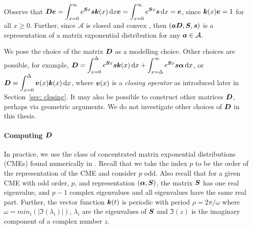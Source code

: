 Observe that \(\boldsymbol D\boldsymbol e = \displaystyle \int_{x=0}^\infty e^{\boldsymbol S x }\boldsymbol s \boldsymbol k(x)\, \mathrm{d} x\boldsymbol e =\displaystyle \int_{x=0}^\infty e^{\boldsymbol S x }\boldsymbol s \, \mathrm{d} x=\boldsymbol e\), since \(\boldsymbol k(x)\boldsymbol e = 1\) for all \(x\geq 0\). Further, since \(\mathcal A\) is closed and convex \citep{MEinAP}, then \((\boldsymbol a \boldsymbol D,\boldsymbol S,\boldsymbol s)\) is a representation of a matrix exponential distribution for any \(\boldsymbol a\in\mathcal A\). 

We pose the choice of the matrix \(\boldsymbol D\) as a modelling choice. Other choices are possible, for example, \(\displaystyle \boldsymbol D = \int_{x=0}^{\Delta}e^{\boldsymbol S x }\boldsymbol s \boldsymbol k(x)\, \mathrm{d} x + \int_{x=\Delta}^\infty e^{\boldsymbol S x }\boldsymbol s\boldsymbol \alpha \, \mathrm{d} x\), or \(\displaystyle \boldsymbol D = \int_{x=0}^{\Delta}\boldsymbol v(x) \boldsymbol k(x)\, \mathrm{d} x\), where \(\boldsymbol v(x)\) is a \emph{closing operator} as introduced later in Section~\ref{sec: closing}. It may also be possible to construct other matrices \(\boldsymbol D\), perhaps via geometric arguments. We do not investigate other choices of \(\boldsymbol D\) in this thesis.

\paragraph{Computing \(\boldsymbol D\)}
In practice, we use the class of concentrated matrix exponential distributions (CMEs) found numerically in \citep{hht2020}. Recall that we take the index \(p\) to be the order of the representation of the CME and consider \(p\) odd. Also recall that for a given CME with odd order, \(p\), and representation \((\boldsymbol\alpha,\boldsymbol S)\), the matrix \(\boldsymbol S\) has one real eigenvalue, and \(p-1\) complex eigenvalues and all eigenvalues have the same real part. Further, the vector function \(\boldsymbol k(t)\) is periodic with period \(\rho = 2\pi/\omega\) where \(\omega=min_i(|\Im(\lambda_i)|)\), \(\lambda_i\) are the eigenvalues of \(\boldsymbol{S}\) and \(\Im(z)\) is the imaginary component of a complex number \(z\). 


